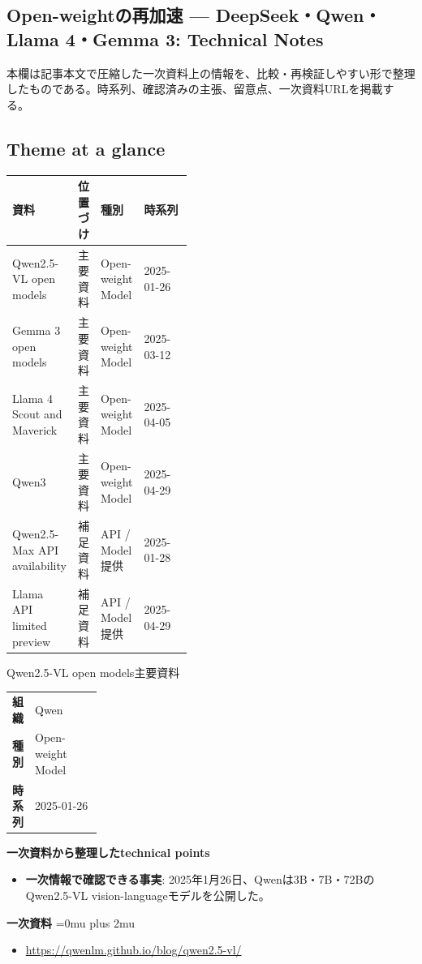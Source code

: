 \subsection*{Open-weightの再加速 — DeepSeek・Qwen・Llama 4・Gemma 3: Technical Notes}
本欄は記事本文で圧縮した一次資料上の情報を、比較・再検証しやすい形で整理したものである。時系列、確認済みの主張、留意点、一次資料URLを掲載する。
\medskip
\subsection*{Theme at a glance}
\begin{center}
\footnotesize
\begin{tabularx}{\linewidth}{@{}p{0.20\linewidth}p{0.10\linewidth}p{0.14\linewidth}X@{}}
\toprule
資料 & 位置づけ & 種別 & 時系列 \\
\midrule
Qwen2.5-VL open models & 主要資料 & Open-weight Model & 2025-01-26 \\
Gemma 3 open models & 主要資料 & Open-weight Model & 2025-03-12 \\
Llama 4 Scout and Maverick & 主要資料 & Open-weight Model & 2025-04-05 \\
Qwen3 & 主要資料 & Open-weight Model & 2025-04-29 \\
Qwen2.5-Max API availability & 補足資料 & API / Model提供 & 2025-01-28 \\
Llama API limited preview & 補足資料 & API / Model提供 & 2025-04-29 \\
\bottomrule
\end{tabularx}
\end{center}
\normalsize

\begin{technicalnote}{Qwen2.5-VL open models}{主要資料}
\begingroup
\begin{tabularx}{\linewidth}{@{}>{\bfseries}p{0.22\linewidth}X@{}}
組織 & Qwen \\
種別 & Open-weight Model \\
時系列 & 2025-01-26 \\
\end{tabularx}
\smallskip
{\bfseries 一次資料から整理したtechnical points}
\begin{itemize}[leftmargin=1.5em,itemsep=0.35em]
\item \textbf{一次情報で確認できる事実}: 2025年1月26日、Qwenは3B・7B・72BのQwen2.5-VL vision-languageモデルを公開した。
\end{itemize}
\begin{samepage}
{\bfseries 一次資料}
\begingroup\sloppy
\Urlmuskip=0mu plus 2mu\relax
\begin{itemize}[leftmargin=1.5em,itemsep=0.25em]
\item {\scriptsize\url{https://qwenlm.github.io/blog/qwen2.5-vl/}}
\end{itemize}
\endgroup
\end{samepage}
\endgroup
\end{technicalnote}
\medskip

